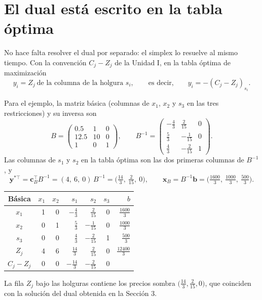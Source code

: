 \documentclass[a4paper,11pt]{article}
\theoremstyle{plain}
\theoremstyle{definition}
\newcommand{\fr}[2]{\tfrac{#1}{#2}}
\begin{document}
\section{El dual está escrito en la tabla óptima}

No hace falta resolver el dual por separado: el simplex lo resuelve al mismo tiempo. Con la convención
$C_j-Z_j$ de la Unidad I, en la tabla óptima de maximización
\[
y_i=Z_j\ \text{de la columna de la holgura } s_i,\qquad\text{es decir,}\qquad y_i=-(C_j-Z_j)_{s_i}.
\]

Para el ejemplo, la matriz básica (columnas de $x_1$, $x_2$ y $s_3$ en las tres restricciones) y su
inversa son
\[
B=\begin{pmatrix}0.5&1&0\\12.5&10&0\\1&0&1\end{pmatrix},\qquad
B^{-1}=\begin{pmatrix}-\fr43&\fr2{15}&0\\[2pt]\fr53&-\fr1{15}&0\\[2pt]\fr43&-\fr2{15}&1\end{pmatrix}.
\]
Las columnas de $s_1$ y $s_2$ en la tabla óptima son las dos primeras columnas de $B^{-1}$, y
\[
\mathbf y^{*\top}=\mathbf c_B^\top B^{-1}=(4,\ 6,\ 0)\,B^{-1}=\Big(\fr{14}{3},\ \fr{2}{15},\ 0\Big),
\qquad
\mathbf x_B=B^{-1}\mathbf b=\Big(\fr{1600}{3},\ \fr{1000}{3},\ \fr{500}{3}\Big).
\]

\begin{center}
\begin{tabular}{@{}c|rrrrr|r@{}}\toprule
Básica & $x_1$ & $x_2$ & $s_1$ & $s_2$ & $s_3$ & $b$\\\midrule
$x_1$ & 1 & 0 & $-\fr43$ & $\fr2{15}$ & 0 & $\fr{1600}3$\\[2pt]
$x_2$ & 0 & 1 & $\fr53$ & $-\fr1{15}$ & 0 & $\fr{1000}3$\\[2pt]
$s_3$ & 0 & 0 & $\fr43$ & $-\fr2{15}$ & 1 & $\fr{500}3$\\\midrule
$Z_j$ & 4 & 6 & $\fr{14}3$ & $\fr2{15}$ & 0 & $\fr{12400}3$\\[2pt]
$C_j-Z_j$ & 0 & 0 & $-\fr{14}3$ & $-\fr2{15}$ & 0 & \\\bottomrule
\end{tabular}
\end{center}

La fila $Z_j$ bajo las holguras contiene los precios sombra $\big(\fr{14}{3},\fr{2}{15},0\big)$, que coinciden con
la solución del dual obtenida en la Sección 3.
\end{document}
